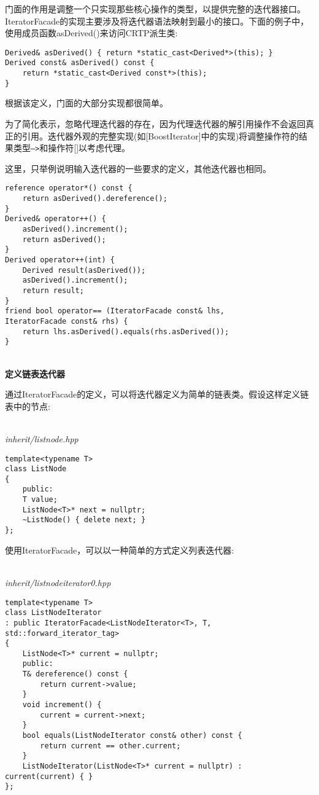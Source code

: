 门面的作用是调整一个只实现那些核心操作的类型，以提供完整的迭代器接口。IteratorFacade的实现主要涉及将迭代器语法映射到最小的接口。下面的例子中，使用成员函数asDerived()来访问CRTP派生类:

\begin{lstlisting}[style=styleCXX]
Derived& asDerived() { return *static_cast<Derived*>(this); }
Derived const& asDerived() const {
	return *static_cast<Derived const*>(this);
}
\end{lstlisting}

根据该定义，门面的大部分实现都很简单。

\begin{tcolorbox}[colback=webgreen!5!white,colframe=webgreen!75!black]
\hspace*{0.75cm}为了简化表示，忽略代理迭代器的存在，因为代理迭代器的解引用操作不会返回真正的引用。迭代器外观的完整实现(如[BoostIterator]中的实现)将调整操作符的结果类型\texttt{—>}和操作符[]以考虑代理。
\end{tcolorbox}

这里，只举例说明输入迭代器的一些要求的定义，其他迭代器也相同。

\begin{lstlisting}[style=styleCXX]
reference operator*() const {
	return asDerived().dereference();
}
Derived& operator++() {
	asDerived().increment();
	return asDerived();
}
Derived operator++(int) {
	Derived result(asDerived());
	asDerived().increment();
	return result;
}
friend bool operator== (IteratorFacade const& lhs,
IteratorFacade const& rhs) {
	return lhs.asDerived().equals(rhs.asDerived());
}
\end{lstlisting}

\hspace*{\fill} \\ %
\noindent
\textbf{定义链表迭代器}

通过IteratorFacade的定义，可以将迭代器定义为简单的链表类。假设这样定义链表中的节点:

\hspace*{\fill} \\ %
\noindent
\textit{inherit/listnode.hpp}
\begin{lstlisting}[style=styleCXX]
template<typename T>
class ListNode
{
	public:
	T value;
	ListNode<T>* next = nullptr;
	~ListNode() { delete next; }
};
\end{lstlisting}

使用IteratorFacade，可以以一种简单的方式定义列表迭代器:

\hspace*{\fill} \\ %
\noindent
\textit{inherit/listnodeiterator0.hpp}
\begin{lstlisting}[style=styleCXX]
template<typename T>
class ListNodeIterator
: public IteratorFacade<ListNodeIterator<T>, T,
std::forward_iterator_tag>
{
	ListNode<T>* current = nullptr;
	public:
	T& dereference() const {
		return current->value;
	}
	void increment() {
		current = current->next;
	}
	bool equals(ListNodeIterator const& other) const {
		return current == other.current;
	}
	ListNodeIterator(ListNode<T>* current = nullptr) : current(current) { }
};
\end{lstlisting}

